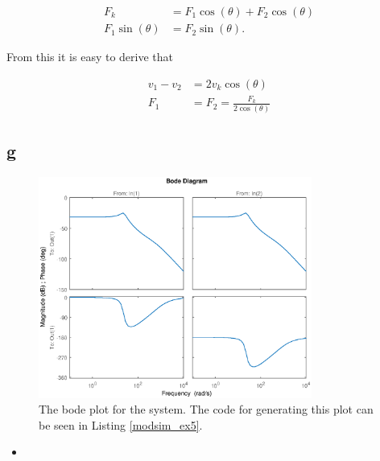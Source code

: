 \documentclass{article}
\newcommand{\matlabscript}[2]{\begin{itemize}\item[]\end{itemize}}
\begin{document}
\begin{align*}
	F_k &= F_1\cos(\theta) + F_2\cos(\theta)\\
	F_1\sin(\theta) &= F_2\sin(\theta).
\end{align*}	

From this it is easy to derive that 

\begin{align*}
	v_1 - v_2 &= 2v_k\cos(\theta)\\
	F_1 &= F_2 = \frac{F_k}{2\cos(\theta)}
\end{align*}

\subsection{g}

\begin{figure}[!ht]\label{fig:bode}
	\centering
	\includegraphics[width = 0.8\textwidth]{modsim_ex5_bode}
    \caption{The bode plot for the system. The code for generating this plot can be seen in Listing \ref{modsim_ex5}.}
\end{figure}


\matlabscript{modsim_ex5}{Code for making the Bode plot in MATLAB}
\end{document}
